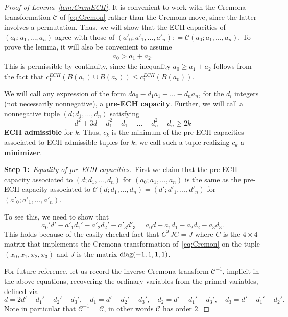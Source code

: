 \documentclass[11pt, reqno]{amsart}
\theoremstyle{remark}
\numberwithin{equation}{subsection}
\numberwithin{figure}{section}
\theoremstyle{customremark}
\newcommand{\NI}{{\noindent}}
\newcommand{\Cc}{{\mathcal C}}
\begin{document}
\begin{proof}[Proof of Lemma~\ref{lem:CremECH}]  It is convenient to work with the Cremona transformation $\Cc$  of \eqref{eq:Cremon}
rather than the Cremona move, since the latter involves a permutation.  Thus, we will show that the ECH capacities of $(a_0;a_1,\dots,a _n)$ agree with those of
$(a'_0; a'_1, \ldots, a'_n): = 
\Cc (a_0; a_1, \ldots, a_n)$.
To prove the lemma, it will also be convenient to  assume 
\begin{align}\label{eq:convenient} a_0 > a_1 + a_2.
\end{align}
This is permissible by continuity, since the inequality  $a_0 \ge a_1 + a_2$ follows from the fact that
$ c_1^{ECH}( B(a_1) \cup  B(a_2) ) \le c_1^{ECH}( B(a_0) )$. 

We will call any expression of the form $d a_0 - d_1 a_1 - \ldots- d_n a_n$, for the $d_i$ integers (not necessarily nonnegative), a {\bf pre-ECH capacity}.  Further, we will call a nonnegative tuple $(d; d_1, \ldots, d_n)$ satisfying $$
d^2 + 3d - d_1^2 - d_1 - \ldots - d_n^2 - d_n \ge 2k
$$
  {\bf ECH admissible} for $k$.  Thus, $c_k$ is the minimum of the pre-ECH capacities associated to ECH admissible tuples for $k$; we call such a tuple realizing $c_k$ a {\bf minimizer}.
\vspace{2 mm}


\NI
{\bf Step 1:}\ {\it  Equality of pre-ECH capacities.}\  First we claim that the pre-ECH capacity associated to $(d; d_1, \ldots, d_n)$ for $(a_0; a_1, \ldots, a_n)$ is the same as the pre-ECH capacity associated to $\Cc(d; d_1,\ldots,d_n) = (d'; d'_1, \ldots, d'_n)$ for $(a'_0; a'_1, \ldots, a'_n)$.  

To see this,  we need to show that
\[ a_0'd' - a'_1d_1' - a'_2d_2' - a'_3d'_3 = a_0d  - a_1 d_1 - a_2 d_2 - a_3 d_3.\]
This holds because of the easily checked fact that   $C^T J C = J$ where $C$ is the $4\times 4$ matrix that implements the Cremona transformation of~\eqref{eq:Cremon} on the tuple $(x_0,x_1,x_2,x_3)$ and $J$ is the matrix ${\rm diag}(-1,1,1,1)$.



For future reference, let us record the inverse Cremona transform $\Cc^{-1}$, implicit in the above equations, recovering the ordinary variables from the primed variables, defined via
\begin{equation}
\label{eqn:inverse}
d =  2d' - d_1' - d_2' - d_3', \quad  d_1 = d' - d_2' - d_3', \quad d_2 = d' - d_1'- d_3', \quad d_3 = d' - d_1' - d_2'.
\end{equation}
Note in particular that $\Cc^{-1} = \Cc$, in other words $\Cc$ has order $2$.


\end{proof}
\end{document}
